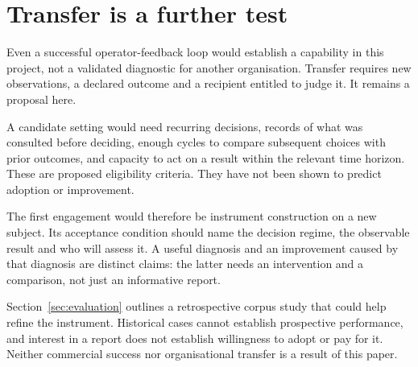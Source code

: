 \section{Transfer is a further test}

Even a successful operator-feedback loop would establish a capability in this
project, not a validated diagnostic for another organisation. Transfer requires
new observations, a declared outcome and a recipient entitled to judge it.
It remains a proposal here.

A candidate setting would need recurring decisions, records of what was
consulted before deciding, enough cycles to compare subsequent choices with
prior outcomes, and capacity to act on a result within the relevant time
horizon. These are proposed eligibility criteria. They have not been shown to
predict adoption or improvement.

The first engagement would therefore be instrument construction on a new
subject. Its acceptance condition should name the decision regime, the
observable result and who will assess it. A useful diagnosis and an improvement
caused by that diagnosis are distinct claims: the latter needs an intervention
and a comparison, not just an informative report.

Section~\ref{sec:evaluation} outlines a retrospective corpus study that could
help refine the instrument. Historical cases cannot establish prospective
performance, and interest in a report does not establish willingness to adopt
or pay for it. Neither commercial success nor organisational transfer is a
result of this paper.
